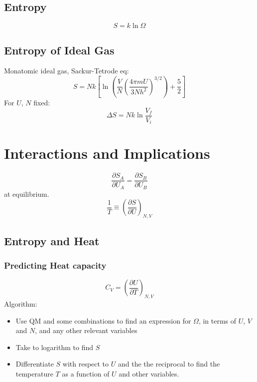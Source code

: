 \documentclass[a4paper,norsk, 10pt]{article}
\begin{document}
\subsection{Entropy}
\begin{equation}
S = k\ln\Omega
\end{equation}
\subsection{Entropy of Ideal Gas}
Monatomic ideal gas, Sackur-Tetrode eq:
\begin{equation}
S = Nk\left[\ln\left(\frac{V}{N}\left(\frac{4\pi mU}{3Nh^2}\right)^{3/2}\right) + \frac{5}{2}\right]
\end{equation}
For $U$, $N$ fixed:
\begin{equation}
\Delta S = Nk\ln\frac{V_f}{V_i}
\end{equation}
\section{Interactions and Implications}
\begin{equation}
\frac{\partial S_A}{\partial U_A} = \frac{\partial S_B}{\partial U_B}
\end{equation}
at equilibrium.
\begin{equation}
\frac{1}{T}\equiv \left(\frac{\partial S}{\partial U}\right)_{N,V}
\end{equation}
\subsection{Entropy and Heat}
\subsubsection{Predicting Heat capacity}
\begin{equation}
C_V = \left(\frac{\partial U}{\partial T}\right)_{N,V}
\end{equation}
Algorithm:
\begin{itemize}
\item Use QM and some combinations to find an expression for $\Omega$, in terms of $U$, $V$ and $N$, and any other relevant variables
\item Take to logarithm to find $S$
\item Differentiate $S$ with respect to $U$ and the the reciprocal to find the temperature $T$ as a function of $U$ and other variables.
\end{itemize}
\end{document}

